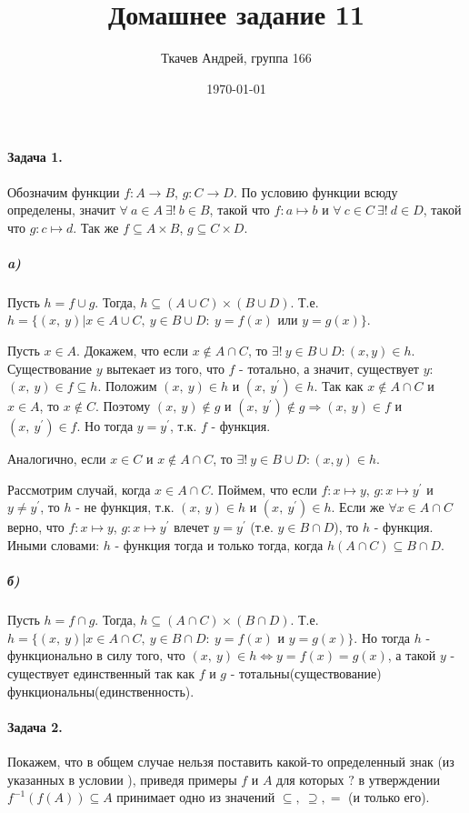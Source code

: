 \documentclass{article}
\title{Домашнее задание 11}
\author{Ткачев Андрей, группа 166}
\date{\today}
\begin{document}
	\maketitle
	\paragraph{Задача 1.}
		Обозначим функции $f: A \rightarrow B$, $g: C \rightarrow D$. По условию функции всюду определены, значит $\forall\ a \in A\ \exists!\ b \in B$, такой что $f: a \mapsto b$ и $\forall\ c \in C\ \exists!\ d \in D$, такой что $g: c \mapsto d$. Так же $f \subseteq A \times B$, $g \subseteq C \times D$.
		
		\subparagraph{a)} Пусть $h = f \cup g$. Тогда, $h \subseteq (A \cup C) \times (B \cup D)$. Т.е. $h = \{(x,\ y)| x \in A \cup C,\ y \in B \cup D:\ y=f(x)$ или $y=g(x)\}$. 
		
		Пусть $x \in A$. Докажем, что если $x \notin A \cap C$, то $\exists!\ y\in B \cup D: (x, y) \in h$. Существование $y$ вытекает из того, что $f$ - тотально, а значит, существует $y$: $(x,\ y) \in f \subseteq h$. Положим $(x,\ y) \in h$ и $(x,\ y^{\prime}) \in h$. Так как $x \notin A \cap C$ и $x \in A$, то $x \notin C$. Поэтому $(x,\ y) \notin g$ и $(x,\ y^{\prime}) \notin g \Rightarrow (x,\ y) \in f$ и $(x,\ y^{\prime}) \in f$. Но тогда $y = y^{\prime}$, т.к. $f$ - функция.
		
		Аналогично, если $x \in C$ и $x \notin A \cap C$, то $\exists!\ y\in B \cup D: (x, y) \in h$. 
		
		Рассмотрим случай, когда $x \in A \cap C$. Поймем, что если $f: x \mapsto y$, $g: x \mapsto y^{\prime}$ и $y \ne y^{\prime}$, то $h$ - не функция, т.к. $(x,\ y) \in h$ и $(x,\ y^{\prime}) \in h$. Если же $\forall x \in A \cap C$ верно, что $f: x \mapsto y$, $g: x \mapsto y^{\prime}$ влечет $y = y^{\prime}$ (т.е. $y \in B \cap D$), то $h$ - функция. Иными словами: $h$ - функция тогда и только тогда, когда $h( A \cap C) \subseteq B\cap D$. 
		
		\subparagraph{б)}  Пусть $h = f \cap g$. Тогда, $h \subseteq (A \cap C) \times (B \cap D)$. Т.е. $h = \{(x,\ y)| x \in A \cap C,\ y \in B \cap D:\ y=f(x)$ и $y=g(x)\}$. Но тогда $h$ - функционально в силу того, что $(x,\ y) \in h \Leftrightarrow y=f(x)=g(x)$, а такой $y$ - существует единственный так как $f$ и $g$ - тотальны(существование) функциональны(единственность).
		
	\paragraph{Задача 2.}
		Покажем, что в общем случае нельзя поставить какой-то определенный знак (из указанных в условии 	 	), приведя примеры $f$ и $A$ для которых $?$ в утверждении $f^{-1}(f(A)) \subseteq A$ принимает одно из значений $\subseteq,\ \supseteq, =$ (и только его).
		
\end{document}
